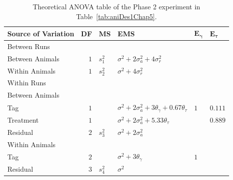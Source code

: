 \begin{table}[ht]
\centering
\caption{Theoretical ANOVA table of the Phase 2 experiment in Table~\ref{tab:aniDes1Chap5}.}
\begin{tabular}{lrllll} 
\toprule 
\multicolumn{1}{l}{\textbf{Source of Variation}} & \multicolumn{1}{l}{\textbf{DF}}& \multicolumn{1}{l}{\textbf{MS}} & \multicolumn{1}{l}{\textbf{EMS}}& \multicolumn{1}{l}{$\bm{E_{\gamma}}$}&\multicolumn{1}{l}{$\bm{E_{\tau}}$}\\ 
\midrule 
Between Runs & & &  & & \\ 
\quad Between Animals & $1$ &$s_1^2$ & $ \sigma^2+2\sigma_{a}^2+4\sigma_{r}^2$ & & \\ 
\quad Within Animals & $1$ &$s_2^2$& $\sigma^2+4\sigma_{r}^2$ & & \\ \hline 
Within Runs &  &&  & & \\ 
\quad Between Animals &&  &  & & \\ 
\quad \quad Tag & $1$ && $\sigma^2+2\sigma_{a}^2+3\theta_{\gamma}+0.67\theta_{\tau}$ &$1$ & $0.111$\\ 
\quad \quad Treatment & $1$ & & $\sigma^2+2\sigma_{a}^2+5.33\theta_{\tau}$ & & $0.889$\\ 
\quad \quad Residual & $2$ &$s_3^2$& $\sigma^2+2\sigma_{a}^2$ & & \\ \hline 
\quad Within Animals &  &&  & & \\ 
\quad \quad Tag & $2$ && $\sigma^2+3\theta_{\gamma}$ &$1$ & \\ 
\quad \quad Residual & $3$ &$s_4^2$& $\sigma^2$ & & \\ 
\bottomrule 
\end{tabular} 
\label{tab:Phase2ANOVAChap5} 
\end{table} 

